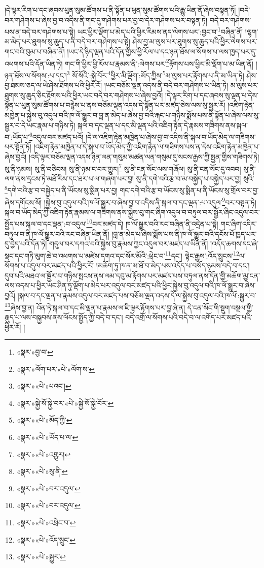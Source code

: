 །དེ་ལྟར་རིག་པ་དང་ཞབས་ཕུན་སུམ་ཚོགས་པ་ནི་སྟོན་པ་ཕུན་སུམ་ཚོགས་པའི་རྒྱུ་ཡིན་ནོ་ཞེས་བསྟན་ཏོ། །བདེ་བར་གཤེགས་པ་ཞེས་བྱ་བ་འདིས་ནི་གང་དུ་གཤེགས་པར་བྱ་བ་དེར་གཤེགས་པར་བསྟན་ཏེ། བདེ་བར་གཤེགས་པས་ན་བདེ་བར་གཤེགས་པ་སྟེ། ཡང་ཕྱིར་ལྡོག་པ་མེད་པའི་ཕྱིར་རིམས་ནད་ལེགས་པར་:བྱང་བ་\footnote{«སྣར་»བྱ་བ་}བཞིན་ནོ། །ལྷག་མ་མེད་པར་ཐུགས་སུ་ཆུད་པ་ནི་བདེ་བར་གཤེགས་པ་སྟེ། ཤེས་བྱ་མ་ལུས་པར་ཐུགས་སུ་ཆུད་པའི་ཕྱིར་ལེགས་པར་གང་བའི་བུམ་པ་བཞིན་ནོ། །ཡང་དེ་ཉིད་ལྡན་པའི་དོན་གྱིས་ཕྱི་རོལ་པ་དང་ཉན་ཐོས་ལ་སོགས་པ་ལས་ཁྱད་པར་དུ་འཕགས་པའི་དོན་ཡིན་ཏེ། གང་གི་ཕྱིར་ཕྱི་རོལ་པ་རྣམས་ནི་:ལེགས་པར་\footnote{«སྣར་»ལོག་པར་«པེ་»ལོག་ས་}རྟོགས་པས་ཕྱིར་མི་ལྡོག་པ་མ་ཡིན་ནོ། །ཉན་ཐོས་ལ་སོགས་:པ་དང་།\footnote{«སྣར་»«པེ་»པའང་།} སོ་སོའི་:སྐྱེ་བོར་\footnote{«སྣར་»སྐྱེ་སོ་སྐྱེ་བར་«པེ་»སྐྱེ་སོ་སྐྱེ་བོར་}ཕྱིར་མི་ལྡོག་:མོད་ཀྱིས་\footnote{«སྣར་»«པེ་»མོད་ཀྱི་}མ་ལུས་པར་རྟོགས་པ་ནི་མ་ཡིན་ཏེ། ཤེས་བྱ་ཐམས་ཅད་ལ་ཡེ་ཤེས་ཐོགས་པའི་ཕྱིར་རོ། །ཡང་བཅོམ་ལྡན་འདས་ནི་བདེ་བར་གཤེགས་པ་ཡིན་ཏེ། མ་ལུས་པར་ཐུགས་སུ་ཆུད་ཅིང་རྟོགས་པའི་ཕྱིར་ཡང་བདེ་བར་གཤེགས་པ་ཞེས་བྱའོ། །དེ་ལྟར་རིག་པ་དང་ཞབས་སུ་ལྡན་པ་དེས་སྟོན་པ་ཕུན་སུམ་ཚོགས་པ་བརྙེས་པ་ནས་བཅོམ་ལྡན་འདས་དེ་སྟོན་པར་མཛད་ཅེས་ལས་སུ་སྦྱར་རོ། །འཇིག་རྟེན་མཁྱེན་པ་སྐྱེས་བུ་འདུལ་བའི་ཁ་ལོ་སྒྱུར་བ་བླ་ན་མེད་པ་ཞེས་བྱ་བའི་རྐང་པ་གཉིས་སྨོས་པས་ནི་སྟོན་པ་ཞེས་ལས་སུ་སྦྱར་བ་དེ་ཡང་རྣམ་པ་གཉིས་ཏེ། སྐལ་བ་དང་ལྡན་པ་དང་མི་ལྡན་པའི་འཇིག་རྟེན་དེ་རྣམས་གཟིགས་ནས་སྐལ་བ་:ཡོད་པ་\footnote{«སྣར་»«པེ་»ཡོད་པ་ལ་}འདུལ་བར་མཛད་པའོ། །དེ་ལ་འཇིག་རྟེན་མཁྱེན་པ་ཞེས་བྱ་བ་འདིས་ནི་སྐལ་བ་ཡོད་མེད་ལ་གཟིགས་པར་སྟོན་ཏོ། །འཇིག་རྟེན་མཁྱེན་པ་དེ་སྐལ་བ་ཡོད་མེད་ཀྱི་འཇིག་རྟེན་ལ་གཟིགས་པས་ན་དེས་འཇིག་རྟེན་མཁྱེན་པ་ཞེས་བྱའོ། །འདི་ལྟར་བཅོམ་ལྡན་འདས་ཉིན་ལན་གསུམ་མཚན་ལན་གསུམ་དུ་སངས་རྒྱས་ཀྱི་སྤྱན་གྱིས་གཟིགས་ཏེ། སུ་ནི་ཉམས། སུ་ནི་བཅིངས། སུ་ནི་ཉམ་ང་བར་གྱུར།\footnote{«སྣར་»«པེ་»འགྱུར།} སུ་ནི་ངན་སོང་ལས་གཞོལ། སུ་ནི་ངན་སོང་དུ་འབབ། སུ་ནི་ལག་ནས་དྲངས་ཏེ་མཐོ་རིས་དང་ཐར་པ་ལ་གཞག་པར་བྱ། སུ་ནི་དགེ་བའི་རྩ་བ་མ་བསྐྱེད་པ་བསྐྱེད་པར་བྱ། སུའི་\footnote{«སྣར་»«པེ་»སུ་ནི་}དགེ་བའི་རྩ་བ་བསྐྱེད་པ་ནི་ཡོངས་སུ་སྨིན་པར་བྱ། གང་དགེ་བའི་རྩ་བ་ཡོངས་སུ་སྨིན་པ་ནི་ཡོངས་སུ་གྲོལ་བར་བྱ་ཞེས་དགོངས་སོ། །སྐྱེས་བུ་འདུལ་བའི་ཁ་ལོ་སྒྱུར་བ་ཞེས་བྱ་བ་འདིས་ནི་སྐལ་བ་དང་ལྡན་:པ་འདུལ་\footnote{«སྣར་»«པེ་»བར་འདུལ་}བར་བསྟན་ཏེ། སྐལ་བ་ཡོད་མེད་ཀྱི་འཇིག་རྟེན་རྣམས་ལ་གཟིགས་ནས་སྐྱེས་བུ་གང་ཞིག་འདུལ་བ་བཏུལ་བར་སྦྱོར་ཞིང་འདུལ་བར་སྤྱོད་པས་སྐལ་བ་དང་ལྡན་:བ་འདུལ་\footnote{«སྣར་»«པེ་»བར་འདུལ་}བར་མཛད་དེ། ཁ་ལོ་སྒྱུར་བའི་རང་བཞིན་ནི་འདྲེན་པ་སྟེ། གང་ཞིག་འདིར་བཏུལ་བ་ནི་ཁ་ལོ་སྒྱུར་བའི་རང་བཞིན་ཡིན་ནོ། །བླ་ན་མེད་པ་ཞེས་སྨོས་པས་ནི་ཁ་ལོ་སྒྱུར་བའི་དངོས་པོ་ཁྱད་པར་དུ་བྱེད་པའི་དོན་ཏེ། གདུལ་བར་དཀའ་བའི་སྐྱེས་བུ་རྣམས་ཀྱང་འདུལ་བར་མཛད་པ་ཡིན་ནོ། །འདོད་ཆགས་དང་ཞེ་སྡང་དང་གཏི་མུག་ཆེ་བ་འཕགས་པ་མཛེས་དགའ་དང་སོར་མོའི་:ཕྲེང་བ་\footnote{«སྣར་»«པེ་»འཕྲེང་བ་}དང་། ལྟེང་རྒྱས་:འོད་སྲུངས་\footnote{«སྣར་»«པེ་»འོད་སྲུང་}ལ་སོགས་པ་འདུལ་བར་མཛད་པའི་ཕྱིར་རོ། །མཆོག་ཏུ་ཁ་ན་མ་ཐོ་བ་མེད་པས་འདོད་པ་བསོད་ཉམས་བདེ་བ་དང་། དུབ་པའི་མཐའ་ལ་སྦྱོར་བ་གཉིས་སྤངས་ནས་ལམ་དབུ་མ་རྟོགས་པར་མཛད་པས་བཏུལ་ནས་དོན་གྱི་མཆོག་མྱ་ངན་ལས་འདས་པ་ཕྱིར་ཡང་ཤིན་ཏུ་ལྡོག་པ་མེད་པར་འདུལ་བར་མཛད་པའི་ཕྱིར་སྐྱེས་བུ་འདུལ་བའི་ཁ་ལོ་སྒྱུར་བ་ཞེས་བྱའོ། །སྐལ་བ་དང་ལྡན་པ་རྣམས་འདུལ་བར་མཛད་པས་བཅོམ་ལྡན་འདས་དེ་ལ་སྐྱེས་བུ་འདུལ་བའི་ཁ་ལོ་:སྒྱུར་བ་\footnote{«སྣར་»«པེ་»སྒྱུར་}ཞེས་བྱ་ན། འོན་ཏེ་སྐལ་བ་དང་མི་ལྡན་པ་རྣམས་ལ་ཇི་ལྟར་རྟོགས་པར་བྱ་ཞེ་ན། དེ་ངན་སོང་གི་སྡུག་བསྔལ་གྱི་རྒུད་པ་ལས་བསྐྱབས་ནས་ལོངས་སྤྱོད་ཀྱི་བདེ་བ་དང་། བདེ་འགྲོ་ལ་སོགས་པའི་བདེ་བ་ལ་འགོད་པར་མཛད་པའི་ཕྱིར་རོ། །
